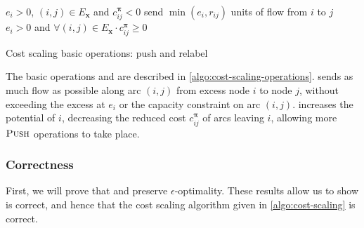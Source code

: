 \begin{algorithm}
\begin{algorithmic}[1]
    \Require $e_i > 0$, $(i,j) \in E_{\mathbf{x}}$ and $c^{\boldsymbol{\pi}}_{ij} < 0$
        \State send $\min\left(e_i, r_{ij}\right)$ units of flow from $i$ to $j$
    \EndFunction    
    \setcounter{ALG@line}{0}
    \Statex
    \Require $e_i > 0$ and $\forall(i,j) \in E_{\mathbf{x}} \cdot c^{\boldsymbol{\pi}}_{ij} \geq 0$
    \EndFunction
\end{algorithmic}
\caption{Cost scaling basic operations: push and relabel}
\label{algo:cost-scaling-operations}
\end{algorithm}

The basic operations  and  are described in \cref{algo:cost-scaling-operations}.  sends as much flow as possible along arc $(i,j)$ from excess node $i$ to node $j$, without exceeding the excess at $e_i$ or the capacity constraint on arc $(i,j)$.  increases the potential of $i$, decreasing the reduced cost $c_{ij}^{\boldsymbol{\pi}}$ of arcs leaving $i$, allowing more $\textproc{Push}$ operations to take place.

\subsubsection{Correctness}

First, we will prove that  and  preserve $\epsilon$-optimality. These results allow us to show  is correct, and hence that the cost scaling algorithm given in \cref{algo:cost-scaling} is correct. \\

